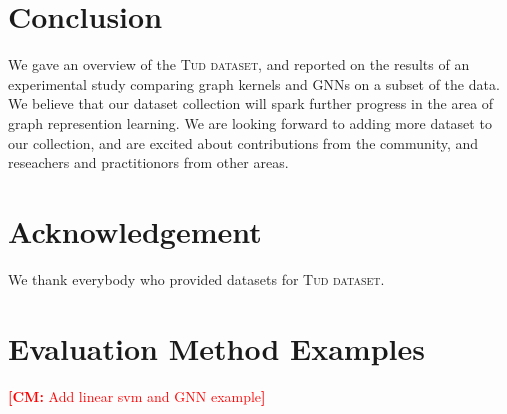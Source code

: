 \documentclass{article}
\theoremstyle{definition}
\newcommand{\cm}[1]{{{\textcolor{red}{\textbf{[CM:} {#1}\textbf{]}}}}}
\begin{document}
\begin{table}[t]\centering		
	\caption{Results for neural and kernel baselines.}
	\label{t2l}	
\end{table}		



\section{Conclusion}

We gave an overview of the \textsc{Tud dataset}, and reported on the results of an experimental study comparing graph kernels and GNNs on a subset of the data. We believe that our dataset collection will spark further progress in the area of graph represention learning. We are looking forward to adding more dataset to our collection, and are excited about contributions from the community, and reseachers and practitionors from other areas.


\section{Acknowledgement}

We thank everybody who provided datasets for \textsc{Tud dataset}.




\appendix

\onecolumn
\section{Evaluation Method Examples}

\cm{Add linear svm and GNN example}
\end{document}
